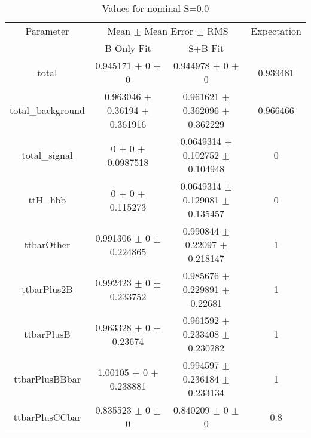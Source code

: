 \begin{table}
\centering
\caption{Values for nominal S=0.0}
\begin{tabular}{cccc}
\toprule
Parameter & \multicolumn{2}{c}{Mean $\pm$ Mean Error $\pm$ RMS} & Expectation\\
 & B-Only Fit & S+B Fit & \\
\midrule
total & \num{0.945171} $\pm$ \num{0} $\pm$ \num{0} & \num{0.944978} $\pm$ \num{0} $\pm$ \num{0} & \num{0.939481}\\
total\_background & \num{0.963046} $\pm$ \num{0.36194} $\pm$ \num{0.361916} & \num{0.961621} $\pm$ \num{0.362096} $\pm$ \num{0.362229} & \num{0.966466}\\
total\_signal & \num{0} $\pm$ \num{0} $\pm$ \num{0.0987518} & \num{0.0649314} $\pm$ \num{0.102752} $\pm$ \num{0.104948} & \num{0}\\
ttH\_hbb & \num{0} $\pm$ \num{0} $\pm$ \num{0.115273} & \num{0.0649314} $\pm$ \num{0.129081} $\pm$ \num{0.135457} & \num{0}\\
ttbarOther & \num{0.991306} $\pm$ \num{0} $\pm$ \num{0.224865} & \num{0.990844} $\pm$ \num{0.22097} $\pm$ \num{0.218147} & \num{1}\\
ttbarPlus2B & \num{0.992423} $\pm$ \num{0} $\pm$ \num{0.233752} & \num{0.985676} $\pm$ \num{0.229891} $\pm$ \num{0.22681} & \num{1}\\
ttbarPlusB & \num{0.963328} $\pm$ \num{0} $\pm$ \num{0.23674} & \num{0.961592} $\pm$ \num{0.233408} $\pm$ \num{0.230282} & \num{1}\\
ttbarPlusBBbar & \num{1.00105} $\pm$ \num{0} $\pm$ \num{0.238881} & \num{0.994597} $\pm$ \num{0.236184} $\pm$ \num{0.233134} & \num{1}\\
ttbarPlusCCbar & \num{0.835523} $\pm$ \num{0} $\pm$ \num{0} & \num{0.840209} $\pm$ \num{0} $\pm$ \num{0} & \num{0.8}\\
\bottomrule
\end{tabular}
\end{table}